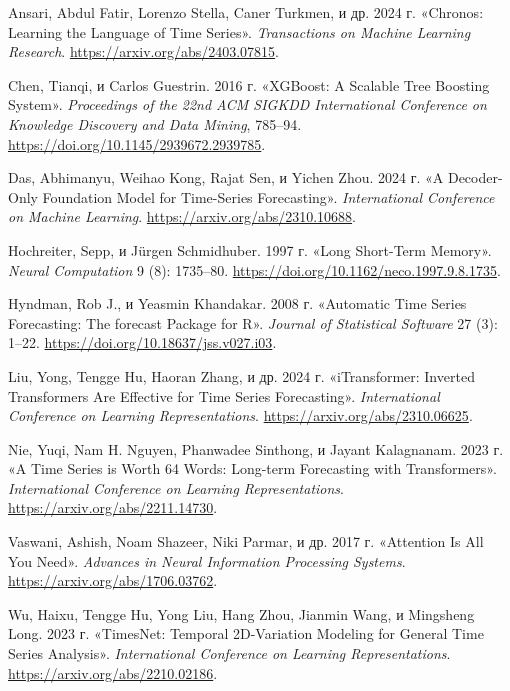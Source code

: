 \protect{}\label{refs}
\begin{CSLReferences}{1}{1}
Ansari, Abdul Fatir, Lorenzo Stella, Caner Turkmen, и др. 2024 г.
{«Chronos: Learning the Language of Time Series»}. \emph{Transactions on
Machine Learning Research}. \url{https://arxiv.org/abs/2403.07815}.

Chen, Tianqi, и Carlos Guestrin. 2016 г. {«XGBoost: A Scalable Tree
Boosting System»}. \emph{Proceedings of the 22nd ACM SIGKDD
International Conference on Knowledge Discovery and Data Mining},
785--94. \url{https://doi.org/10.1145/2939672.2939785}.

Das, Abhimanyu, Weihao Kong, Rajat Sen, и Yichen Zhou. 2024 г. {«A
Decoder-Only Foundation Model for Time-Series Forecasting»}.
\emph{International Conference on Machine Learning}.
\url{https://arxiv.org/abs/2310.10688}.

Hochreiter, Sepp, и Jürgen Schmidhuber. 1997 г. {«Long Short-Term
Memory»}. \emph{Neural Computation} 9 (8): 1735--80.
\url{https://doi.org/10.1162/neco.1997.9.8.1735}.

Hyndman, Rob J., и Yeasmin Khandakar. 2008 г. {«Automatic Time Series
Forecasting: The forecast Package for R»}. \emph{Journal of Statistical
Software} 27 (3): 1--22. \url{https://doi.org/10.18637/jss.v027.i03}.

Liu, Yong, Tengge Hu, Haoran Zhang, и др. 2024 г. {«iTransformer:
Inverted Transformers Are Effective for Time Series Forecasting»}.
\emph{International Conference on Learning Representations}.
\url{https://arxiv.org/abs/2310.06625}.

Nie, Yuqi, Nam H. Nguyen, Phanwadee Sinthong, и Jayant Kalagnanam. 2023
г. {«A Time Series is Worth 64 Words: Long-term Forecasting with
Transformers»}. \emph{International Conference on Learning
Representations}. \url{https://arxiv.org/abs/2211.14730}.

Vaswani, Ashish, Noam Shazeer, Niki Parmar, и др. 2017 г. {«Attention Is
All You Need»}. \emph{Advances in Neural Information Processing
Systems}. \url{https://arxiv.org/abs/1706.03762}.

Wu, Haixu, Tengge Hu, Yong Liu, Hang Zhou, Jianmin Wang, и Mingsheng
Long. 2023 г. {«TimesNet: Temporal 2D-Variation Modeling for General
Time Series Analysis»}. \emph{International Conference on Learning
Representations}. \url{https://arxiv.org/abs/2210.02186}.


\end{CSLReferences}
